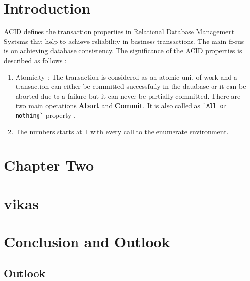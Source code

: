 \documentclass[
  a4paper,  %
  twoside,  %
  bibliography=totoc,
  headsepline,
  cleardoublepage=empty,
  parskip=half,
  draft=false
]{scrbook}
\begin{document}
%
%


\chapter{Introduction}

ACID defines the transaction properties in Relational Database Management Systems that help to achieve reliability in business transactions. The main focus is on achieving database consistency. The significance of the ACID properties is described as follows :
\begin{enumerate}
  \item Atomicity : The transaction is considered as an atomic unit of work and a transaction can either be committed successfully in the database or it can be aborted due to a failure but it can never be partially committed. There are two main operations \textbf{Abort} and \textbf{Commit}. It is also called as \verb|`All or nothing`| property \cite{RVvdA2016}.
  \item The numbers starts at 1 with every call to the enumerate environment.
\end{enumerate}

\chapter{Chapter Two}
\label{chap:k2}



\blinddocument

\chapter{vikas}

\chapter{Conclusion and Outlook}
\label{chap:zusfas}

\section*{Outlook}

\printbibliography

\appendix
%

\pagestyle{empty}
\renewcommand*{\chapterpagestyle}{empty}
\Versicherung
\end{document}
